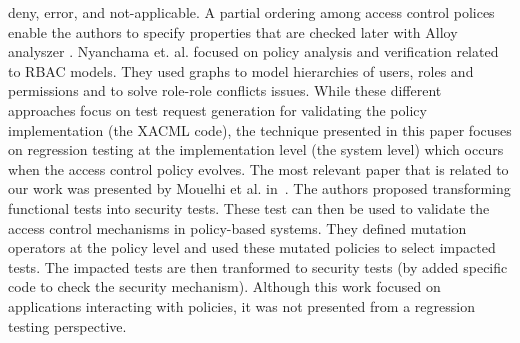 deny, error, and not-applicable. A partial ordering among access control polices enable the authors to specify properties that are checked later
with Alloy analyszer \cite{Alloy}. Nyanchama et. al. \cite{Nyanchama99therole} focused on policy analysis and verification related to 
RBAC models. They used graphs to model hierarchies of users, roles and permissions and to solve role-role conflicts issues.
While these different approaches focus on test request generation for validating the policy implementation (the XACML code), 
the technique presented in this paper focuses on regression testing at the implementation level (the system level) which occurs when the access control policy evolves. 
 The most relevant paper that is related to our work was presented by Mouelhi et al. in~\cite{mouelhi09:tranforming}. The authors proposed transforming functional tests into security tests. 
These test can then be used to validate the access control mechanisms in policy-based systems. They defined mutation operators at the policy level and used these mutated policies to select impacted tests. The impacted tests are then tranformed to security tests (by added specific code to check the security mechanism). 
Although this work focused on applications interacting with policies, it was not presented from a regression testing perspective. 




